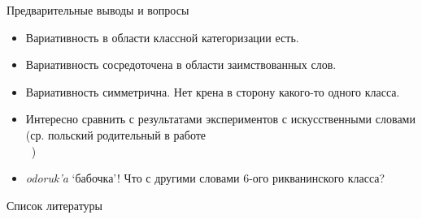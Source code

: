\documentclass[13pt, t]{beamer}
\begin{document}
\begin{frame}{Предварительные выводы и вопросы}
\begin{itemize}
\item Вариативность в области классной категоризации есть.
\item Вариативность сосредоточена в области заимствованных слов.
\item Вариативность симметрична. Нет крена в сторону какого-то одного класса.
\item Интересно сравнить с результатами экспериментов с искусственными словами (ср. польский родительный в работе\\ \ \hfill\citep{dabrowska05})
\item \textit{odoruk'a} `бабочка'! Что с другими словами 6-ого рикванинского класса?
\end{itemize}
\end{frame}


\begin{frame}{Список литературы}
\footnotesize


\end{frame}
\end{document}
